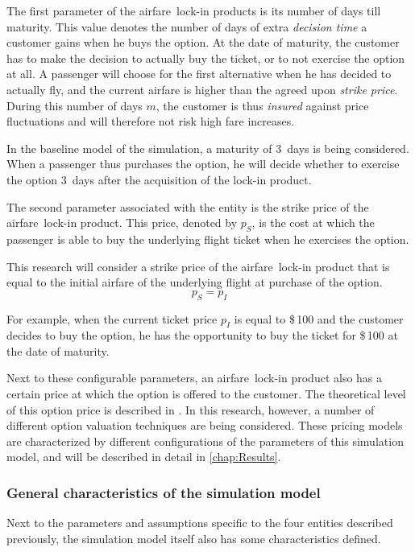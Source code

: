 The first parameter of the airfare~lock-in products is its number of days till maturity. This value denotes the number of days of extra \emph{decision time} a customer gains when he buys the option. At the date of maturity, the customer has to make the decision to actually buy the ticket, or to not exercise the option at all. A passenger will choose for the first alternative when he has decided to actually fly, and the current airfare is higher than the agreed upon \emph{strike price}. During this number of days $m$, the customer is thus \emph{insured} against price fluctuations and will therefore not risk high fare increases.

In the baseline model of the simulation, a maturity of 3~days is being considered. When a passenger thus purchases the option, he will decide whether to exercise the option 3~days after the acquisition of the lock-in product.

The second parameter associated with the entity is the strike price of the airfare~lock-in product. This price, denoted by $p_S$, is the cost at which the passenger is able to buy the underlying flight ticket when he exercises the option.

This research will consider a strike price of the airfare~lock-in product that is equal to the initial airfare of the underlying flight at purchase of the option.
$$p_S = p_I$$

For example, when the current ticket price $p_I$ is equal to \$\,100 and the customer decides to buy the option, he has the opportunity to buy the ticket for \$\,100 at the date of maturity.

Next to these configurable parameters, an airfare~lock-in product also has a certain price at which the option is offered to the customer. The theoretical level of this option price is described in . In this research, however, a number of different option valuation techniques are being considered. These pricing models are characterized by different configurations of the parameters of this simulation model, and will be described in detail in \autoref{chap:Results}. 


\subsubsection{General characteristics of the simulation model}
Next to the parameters and assumptions specific to the four entities described previously, the simulation model itself also has some characteristics defined.

